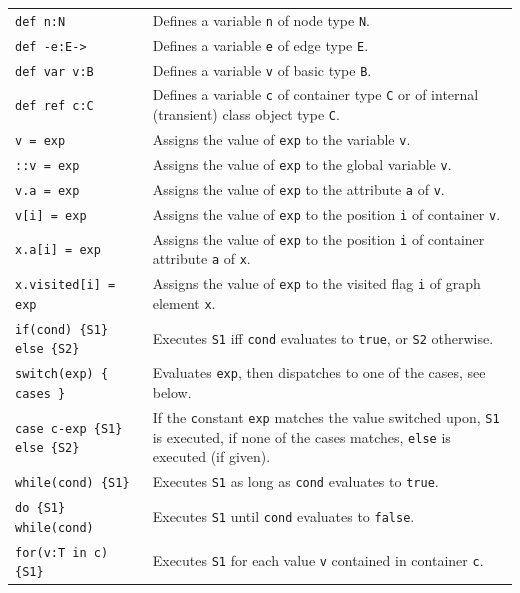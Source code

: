 \begin{table}[htbp]
\begin{minipage}{\linewidth} \renewcommand{\footnoterule}{} 
\begin{tabularx}{\linewidth}{|lX|}
\hline
\texttt{def n:N}	& Defines a variable \texttt{n} of node type \texttt{N}.\\
\texttt{def -e:E->}	& Defines a variable \texttt{e} of edge type \texttt{E}.\\
\texttt{def var v:B}	& Defines a variable \texttt{v} of basic type \texttt{B}.\\
\texttt{def ref c:C}	& Defines a variable \texttt{c} of container type \texttt{C} or of internal (transient) class object type \texttt{C}.\\
\hline
\texttt{v = exp} & Assigns the value of \texttt{exp} to the variable \texttt{v}.\\
\texttt{::v = exp} & Assigns the value of \texttt{exp} to the global variable \texttt{v}.\\
\texttt{v.a = exp} & Assigns the value of \texttt{exp} to the attribute \texttt{a} of \texttt{v}.\\
\texttt{v[i] = exp} & Assigns the value of \texttt{exp} to the position \texttt{i} of container \texttt{v}.\\
\texttt{x.a[i] = exp} & Assigns the value of \texttt{exp} to the position \texttt{i} of container attribute \texttt{a} of \texttt{x}.\\
\texttt{x.visited[i] = exp} & Assigns the value of \texttt{exp} to the visited flag \texttt{i} of graph element \texttt{x}.\\
\hline
\texttt{if(cond) \{S1\} else \{S2\}} & Executes \texttt{S1} iff \texttt{cond} evaluates to \texttt{true}, or \texttt{S2} otherwise.\\
\texttt{switch(exp) \{ cases \}} & Evaluates \texttt{exp}, then dispatches to one of the cases, see below.\\
\texttt{case c-exp \{S1\} else \{S2\}} & If the \texttt{c}onstant \texttt{exp} matches the value switched upon, \texttt{S1} is executed, if none of the cases matches, \texttt{else} is executed (if given).\\
\texttt{while(cond) \{S1\} } & Executes \texttt{S1} as long as \texttt{cond} evaluates to \texttt{true}.\\
\texttt{do \{S1\} while(cond) } & Executes \texttt{S1} until \texttt{cond} evaluates to \texttt{false}.\\
\texttt{for(v:T in c) \{S1\} } & Executes \texttt{S1} for each value \texttt{v} contained in container \texttt{c}.\\

\end{tabularx}
\end{minipage}
\end{table}
